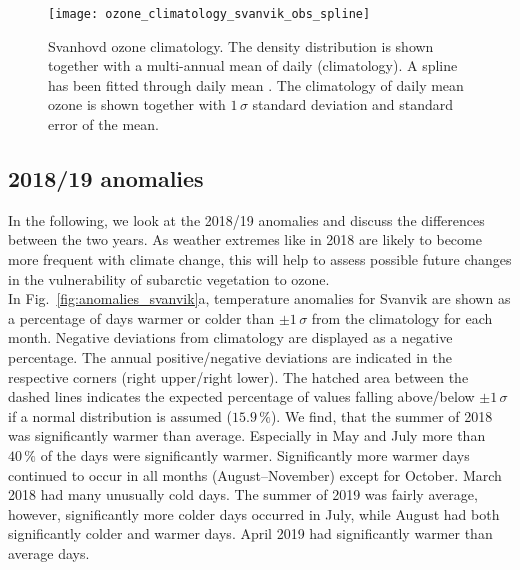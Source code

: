 \documentclass[bg, manuscript]{copernicus}
\begin{document}
\begin{figure}[t]
  \texttt{[image: ozone\_climatology\_svanvik\_obs\_spline]}
  \caption{Svanhovd ozone climatology. The density distribution is shown together with a multi-annual mean of daily \chem{[O_3]} (climatology). A spline has been fitted through daily mean \chem{[O_3]}. The climatology of daily mean ozone is shown together with $1\,\sigma$ standard deviation and standard error of the mean.}
  \label{fig:ozone_climatology_fenoscandic_obs_spline}
\end{figure}

\subsection{2018/19 anomalies}
\label{subsec:anomalies}
In the following, we look at the 2018/19 anomalies and discuss the differences between the two years. As weather extremes like in 2018 are likely to become more frequent with climate change, this will help to assess possible future changes in the vulnerability of subarctic vegetation to ozone.\\ 

In Fig.~\ref{fig:anomalies_svanvik}a, temperature anomalies for Svanvik are shown as a percentage of days warmer or colder than $\pm 1\,\sigma$ from the climatology for each month. Negative deviations from climatology are displayed as a negative percentage. The annual positive/negative deviations are indicated in the respective corners (right upper/right lower). The hatched area between the dashed lines indicates the expected percentage of values falling above/below $\pm 1\,\sigma$ if a normal distribution is assumed ($15.9\,\unit{\%}$). We find, that the summer of 2018 was significantly warmer than average. Especially in May and July more than $40\,\unit{\%}$ of the days were significantly warmer. Significantly more warmer days continued to occur in all months (August--November) except for October. March 2018 had many unusually cold days. The summer of 2019 was fairly average, however, significantly more colder days occurred in July, while August had both significantly colder and warmer days. April 2019 had significantly warmer than average days.
\end{document}
